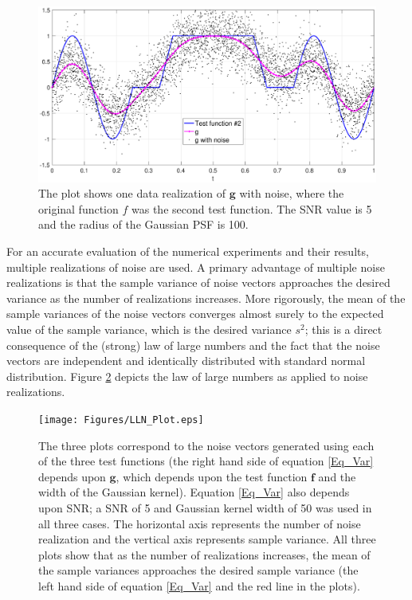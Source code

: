 \documentclass[12pt]{article}
\newcommand{\gdis}{\mathbf{g}}
\newcommand{\fdis}{\mathbf{f}}
\newcommand{\SD}{s}	%
\begin{document}
\begin{figure}
	\centerline{\includegraphics[scale = 0.45]{Figures/NoisePlot1D_F2_S05_W200.eps}}
\caption{The plot shows one data realization of $\gdis$ with noise, where the original function $f$ was the second test function. The SNR value is 5 and the radius of the Gaussian PSF is 100.}
\label{NoisePlot1D_F2_S05_W200}
\end{figure}

For an accurate evaluation of the numerical experiments and their results, multiple realizations of noise are used. A primary advantage of multiple noise realizations is that the sample variance of noise vectors approaches the desired variance as the number of realizations increases. More rigorously, the mean of the sample variances of the noise vectors converges almost surely to the expected value of the sample variance, which is the desired variance $\SD^2$; this is a direct consequence of the (strong) law of large numbers and the fact that the noise vectors are independent and identically distributed with standard normal distribution. Figure \ref{LLN_Plot} depicts the law of large numbers as applied to noise realizations.  \par

\begin{figure}
\centerline{\texttt{[image: Figures/LLN\_Plot.eps]}}
\caption{The three plots correspond to the noise vectors generated using each of the three test functions (the right hand side of equation \eqref{Eq_Var} depends upon $\gdis$, which depends upon the test function $\fdis$ and the width of the Gaussian kernel). Equation \eqref{Eq_Var} also depends upon SNR; a SNR of 5 and Gaussian kernel width of 50 was used in all three cases. The horizontal axis represents the number of noise realization and the vertical axis represents sample variance. All three plots show that as the number of realizations increases, the mean of the sample variances approaches the desired sample variance (the left hand side of equation \eqref{Eq_Var} and the red line in the plots).}
\label{LLN_Plot}
\end{figure}
\end{document}
